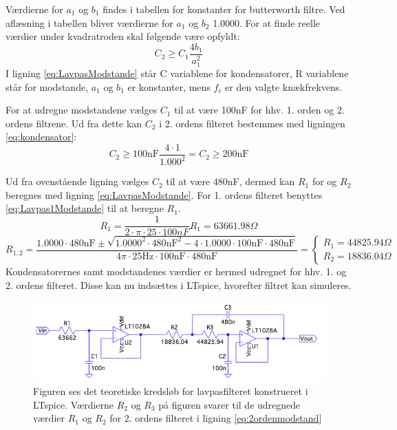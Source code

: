 \noindent Værdierne for $a_{1}$ og $b_{1}$ findes i tabellen for konstanter for butterworth filtre. Ved aflæsning i tabellen bliver værdierne for $a_{1}$  og  $b_{2}$ 1.0000. For at finde reelle værdier under kvadratroden skal følgende være opfyldt:
\begin{equation} \label{eq:kondensator}
C_2 \geq C_1 \frac{4b_1}{a_1^2}
\end{equation}
I ligning \ref{eq:LavpasModstande} står C variablene for kondensatorer, R variablene står for modstande, $a_1$ og $b_1$ er konstanter, mens $f_c$ er den valgte knækfrekvens. 

\noindent For at udregne modstandene vælges $C_1$ til at være 100nF for hhv. 1. orden og 2. ordens filtrene. Ud fra dette kan $C_2$ i 2. ordens filteret bestemmes med ligningen \ref{eq:kondensator}:
\begin{equation} 
C_2 \geq 100\text{nF} \frac{4\cdot 1}{1.000^2} = C_2 \geq 200\text{nF}
\end{equation}

\noindent Ud fra ovenstående ligning vælges $C_2$ til at være 480nF, dermed kan $R_1$ for og $R_2$ beregnes med ligning \ref{eq:LavpasModstande}. For 1. ordens filteret benyttes \ref{eq:Lavpas1Modstande} til at beregne $R_1$.
\begin{equation} \label{eq:Lavpas1Modstande}
R_{1} = \frac{1}{2 \cdot \pi \cdot 25 \cdot 100nF} R_{1} = 63661.98 \Omega
\end{equation}
\begin{equation} \label{eq:2ordenmodstand}
R_{1,2} = \frac{1.0000 \cdot 480\text{nF} \pm \sqrt{1.0000^2 \cdot 480\text{nF}^2 - 4 \cdot 1.0000 \cdot 100\text{nF} \cdot 480\text{nF}}}{4 \pi \cdot 25\text{Hz} \cdot 100\text{nF} \cdot 480\text{nF}} = \begin{cases} R_{1} =  44825.94\Omega \\ R_{2} = 18836.04 \Omega \end{cases}
\end{equation}
\noindent Kondensatorernes samt modstandenes værdier er hermed udregnet for hhv. 1. og 2. ordens filteret. Disse kan nu indsættes i LTspice, hvorefter filtret kan simuleres. 

\begin{figure}[H]
	\centering
	\includegraphics[scale=0.58]{figures/cProblemloesning/Lavpasfilter1_LTspice.PNG}
	\caption{Figuren ses det teoretiske kredsløb for lavpasfilteret konstrueret i LTspice. Værdierne $R_{2}$ og $R_{3}$ på figuren svarer til de udregnede værdier $R_{1}$ og $R_{2}$ for 2. ordens filteret i ligning \ref{eq:2ordenmodstand}}
	\label{fig:lavpasfilter1_LTspice}
\end{figure}

